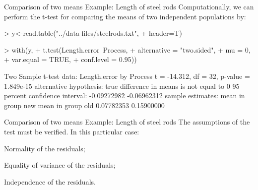 \documentclass[t]{beamer}
\begin{document}
\begin{ftstf}
{Comparison of two means}
{Example: Length of steel rods}
Computationally, we can perform the t-test for comparing the means of two independent populations by:
\vhalf
\begin{rcode}
> y<-read.table("../data files/steelrods.txt",
+               header=T)

> with(y,
+      t.test(Length.error~Process, 
+             alternative = "two.sided", 
+             mu = 0, 
+             var.equal = TRUE, 
+             conf.level = 0.95))

Two Sample t-test
data:  Length.error by Process
t = -14.312, df = 32, p-value = 1.849e-15
alternative hypothesis: true difference in means is not equal to 0
95 percent confidence interval:
 -0.09272982 -0.06962312
sample estimates:
mean in group new mean in group old 
       0.07782353        0.15900000 
\end{rcode}
\end{ftstf}


\begin{ftstf}
{Comparison of two means}
{Example: Length of steel rods}
The assumptions of the test must be verified. In this particular case:

\bitems \alert{Normality of the residuals};
\item Equality of variance of the residuals;
\item Independence of the residuals.
\eitem
{}
\end{ftstf}
\end{document}
